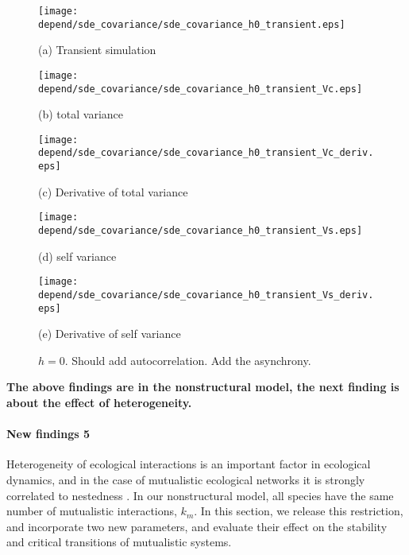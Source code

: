 \documentclass[a4paper,fleqn,12pt]{article}
\begin{document}
\begin{figure}[htbp]
\begin{minipage}{0.45\linewidth}
  \texttt{[image: depend/sde\_covariance/sde\_covariance\_h0\_transient.eps]}
  {\centering(a) Transient simulation \par}
\end{minipage}
\vfill
\begin{minipage}{0.3\linewidth}
  \texttt{[image: depend/sde\_covariance/sde\_covariance\_h0\_transient\_Vc.eps]}
  {\centering(b) total variance  \par}
\end{minipage}
\hfill
\begin{minipage}{0.3\linewidth}
  \texttt{[image: depend/sde\_covariance/sde\_covariance\_h0\_transient\_Vc\_deriv.eps]}
  {\centering(c) Derivative of total variance\par}
\end{minipage}
\vfill
\begin{minipage}{0.3\linewidth}
  \texttt{[image: depend/sde\_covariance/sde\_covariance\_h0\_transient\_Vs.eps]}
  {\centering(d) self variance  \par}
\end{minipage}
\hfill
\begin{minipage}{0.3\linewidth}
  \texttt{[image: depend/sde\_covariance/sde\_covariance\_h0\_transient\_Vs\_deriv.eps]}
  {\centering(e) Derivative of self variance\par}
\end{minipage}
\caption{$h = 0$. {\color{red}Should add autocorrelation. Add the asynchrony.}}
\label{fig:sde_covariance_h0}
\end{figure}

\textbf{The above findings are in the nonstructural model, the next finding is about the effect of heterogeneity.}

\paragraph*{New findings 5}
Heterogeneity of ecological interactions is an important factor in ecological dynamics, and in the case of mutualistic ecological networks it is strongly correlated to nestedness \cite{jonhson_factors_2013}. In our nonstructural model, all species have the same number of mutualistic interactions, $k_m$.
In this section, we release this restriction, and incorporate two new parameters, and evaluate their effect on the stability and critical transitions of mutualistic systems.
\end{document}

